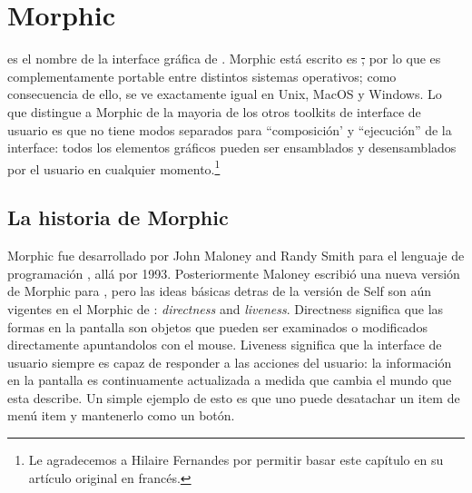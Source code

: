 \documentclass[a4paper,10pt,twoside]{book}
\begin{document}
	\sloppy
\fi
\chapter{Morphic}


 es el nombre de la interface gr\'afica de \pharo.
Morphic est\'a escrito es \st, por lo que es complementamente portable entre distintos sistemas operativos; como consecuencia de ello, \pharo se ve exactamente igual en Unix, MacOS y Windows.
Lo que distingue a Morphic de la mayoria de los otros toolkits de interface de usuario es que no tiene modos separados para  ``composici\'on' y ``ejecuci\'on'' de la interface: todos los elementos gr\'aficos pueden ser ensamblados y desensamblados por el usuario en cualquier momento.\footnote{Le agradecemos a Hilaire Fernandes por permitir basar este cap\'itulo en su art\'iculo original en franc\'es.}



\section{La historia de Morphic}

Morphic fue desarrollado por John Maloney and Randy Smith para el lenguaje de programaci\'on  , all\'a por 1993. 
Posteriormente Maloney escribi\'o una nueva versi\'on de Morphic para \squeak, pero las ideas b\'asicas detras de la versi\'on de Self son a\'un vigentes en el Morphic de \pharo: \emph{directness} and \emph{liveness}.
Directness significa que las formas en la pantalla son objetos que pueden ser examinados o modificados directamente apuntandolos con el mouse.
Liveness significa que la interface de usuario siempre es capaz de responder a las acciones del usuario: la informaci\'on en la pantalla es continuamente actualizada a medida que cambia el mundo que esta describe.
Un simple ejemplo de esto es que uno puede desatachar un item de men\'u item y mantenerlo como un bot\'on.
\end{document}
